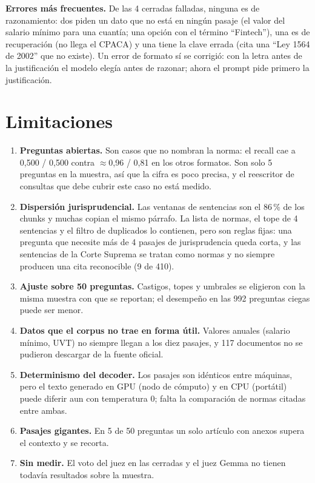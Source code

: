 \documentclass[10pt,twocolumn,letterpaper]{article}
\begin{document}
\textbf{Errores más frecuentes.} De las 4 cerradas falladas, ninguna es de
razonamiento: dos piden un dato que no está en ningún pasaje (el valor del salario
mínimo para una cuantía; una opción con el término ``Fintech''), una es de recuperación
(no llega el CPACA) y una tiene la clave errada (cita una ``Ley 1564 de 2002'' que no
existe). Un error de formato sí se corrigió: con la letra antes de la justificación el
modelo elegía antes de razonar; ahora el prompt pide primero la justificación.

\section{Limitaciones}

\begin{enumerate}
\item \textbf{Preguntas abiertas.} Son casos que no nombran la norma: el recall cae a
0,500 / 0,500 contra $\approx$0,96 / 0,81 en los otros formatos. Son solo 5 preguntas en
la muestra, así que la cifra es poco precisa, y el reescritor de consultas que debe
cubrir este caso no está medido.
\item \textbf{Dispersión jurisprudencial.} Las ventanas de sentencias son el 86\,\% de
los chunks y muchas copian el mismo párrafo. La lista de normas, el tope de 4 sentencias
y el filtro de duplicados lo contienen, pero son reglas fijas: una pregunta que necesite
más de 4 pasajes de jurisprudencia queda corta, y las sentencias de la Corte Suprema se
tratan como normas y no siempre producen una cita reconocible (9 de 410).
\item \textbf{Ajuste sobre 50 preguntas.} Castigos, topes y umbrales se eligieron con la
misma muestra con que se reportan; el desempeño en las 992 preguntas ciegas puede ser
menor.
\item \textbf{Datos que el corpus no trae en forma útil.} Valores anuales (salario
mínimo, UVT) no siempre llegan a los diez pasajes, y 117 documentos no se pudieron
descargar de la fuente oficial.
\item \textbf{Determinismo del decoder.} Los pasajes son idénticos entre máquinas, pero
el texto generado en GPU (nodo de cómputo) y en CPU (portátil) puede diferir aun con
temperatura 0;
falta la comparación de normas citadas entre ambas.
\item \textbf{Pasajes gigantes.} En 5 de 50 preguntas un solo artículo con anexos
supera el contexto y se recorta.
\item \textbf{Sin medir.} El voto del juez en las cerradas y el juez Gemma no tienen
todavía resultados sobre la muestra.
\end{enumerate}
\end{document}
